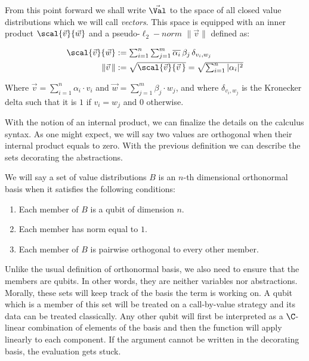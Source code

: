 From this point forward we shall write $\vec{\Val}$ to the space of all closed value distributions which we will call \emph{vectors}. This space is equipped with an inner product $\scal{\vec v}{\vec w}$ and a pseudo-$\ell_2-norm$ $\|\vec v\|$ defined as:

\begin{align*}
  \textstyle\scal{\vec{v}}{\vec{w}}&:=\textstyle\sum_{i=1}^n\sum_{j=1}^m\overline{\alpha_i}\,\beta_j\,\delta_{v_i,w_j}\\
  \textstyle\|\vec{v}\,\|&:=\textstyle\sqrt{\scal{\vec{v}}{\vec{v}\,}}=\textstyle\sqrt{\sum_{i=1}^n|\alpha_i|^2}    
\end{align*}

Where $\vec{v}=\sum_{i=1}^n\alpha_i\cdot v_i$ and $\vec{w}=\sum_{j=1}^m\beta_j\cdot w_j$, and where $\delta_{v_i,w_j}$ is the Kronecker delta such that it is $1$ if $v_i=w_j$ and $0$ otherwise.

With the notion of an internal product, we can finalize the details on the calculus syntax. As one might expect, we will say two values are orthogonal when their internal product equals to zero. With the previous definition we can describe the sets decorating the abstractions.

\begin{definition}\label{def:NthDimensionalBasis}
We will say a set of value distributions $B$ is an $n$-th dimensional orthonormal basis when it satisfies the following conditions:
\begin{enumerate}
  \item Each member of $B$ is a qubit of dimension $n$.
  \item Each member has norm equal to $1$.
  \item Each member of $B$ is pairwise orthogonal to every other member. 
\end{enumerate}
\end{definition}

Unlike the usual definition of orthonormal basis, we also need to ensure that the members are qubits. In other words, they are neither variables nor abstractions. Morally, these sets will keep track of the basis the term is working on. A qubit which is a member of this set will be treated on a call-by-value strategy and its data can be treated classically. Any other qubit will first be interpreted as a $\C$-linear combination of elements of the basis and then the function will apply linearly to each component. If the argument cannot be written in the decorating basis, the evaluation gets stuck. 

